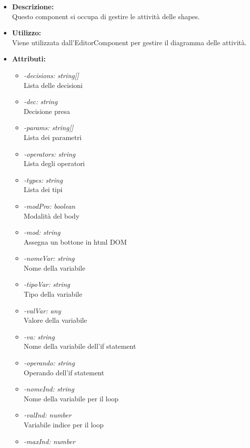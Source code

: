 \begin{itemize}
	
	\item \textbf{Descrizione:}\\
	Questo component si occupa di gestire le attività delle shapes.
	\item \textbf{Utilizzo:}\\
	Viene utilizzata dall'EditorComponent per gestire il diagramma delle attività.
	\item \textbf{Attributi:}
		\begin{itemize}
			\item \emph{-decisions: string[]}\\
			Lista delle decisioni
			\item \emph{-dec: string}\\
			Decisione presa
			\item \emph{-params: string[]}\\
			Lista dei parametri
			\item \emph{-operators: string}\\
			Lista degli operatori
			\item \emph{-types: string}\\
			Lista dei tipi
			\item \emph{-modPro: boolean}\\
			Modalità del body
			\item \emph{-mod: string}\\
			Assegna un bottone in html DOM
			\item \emph{-nomeVar: string}\\
			Nome della variabile
			\item \emph{-tipoVar: string}\\
			Tipo della variabile
			\item \emph{-valVar: any}\\
			Valore della variabile
			\item \emph{-va: string}\\
			Nome della variabile dell'if statement
			\item \emph{-operando: string}\\
			Operando dell'if statement
			\item \emph{-nomeInd: string}\\
			Nome della variabile per il loop
			\item \emph{-valInd: number}\\
			Variabile indice per il loop
			\item \emph{-maxInd: number}\\

\end{itemize}
\end{itemize}
